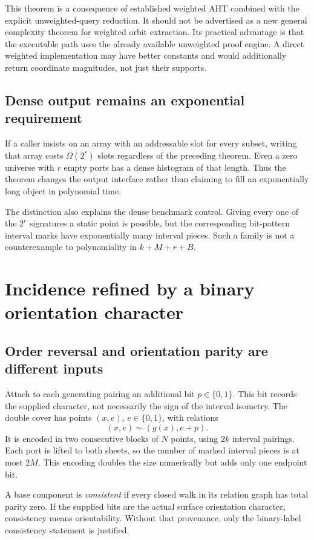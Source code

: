 \documentclass[11pt,letterpaper]{article}
\begin{document}
This theorem is a consequence of established weighted AHT combined with the
explicit unweighted-query reduction. It should not be advertised as a new
general complexity theorem for weighted orbit extraction. Its practical
advantage is that the executable path uses the already available unweighted
proof engine. A direct weighted implementation may have better constants and
would additionally return coordinate magnitudes, not just their supports.

\subsection{Dense output remains an exponential requirement}
If a caller insists on an array with an addressable slot for every subset,
writing that array costs $\Omega(2^r)$ slots regardless of the preceding theorem.
Even a zero universe with $r$ empty ports has a dense histogram of that length.
Thus the theorem changes the output interface rather than claiming to fill an
exponentially long object in polynomial time.

The distinction also explains the dense benchmark control. Giving every one
of the $2^r$ signatures a static point is possible, but the corresponding
bit-pattern interval marks have exponentially many interval pieces. Such a
family is not a counterexample to polynomiality in $k+M+r+B$.

\section{Incidence refined by a binary orientation character}
\label{sec:signed}

\subsection{Order reversal and orientation parity are different inputs}
Attach to each generating pairing an additional bit $p\in\{0,1\}$. This bit
records the supplied character, not necessarily the sign of the interval
isometry. The double cover has points $(x,e)$, $e\in\{0,1\}$, with relations
\[
 (x,e)\sim(g(x),e+p).
\]
It is encoded in two consecutive blocks of $N$ points, using $2k$ interval
pairings. Each port is lifted to both sheets, so the number of marked interval
pieces is at most $2M$. This encoding doubles the size numerically but adds
only one endpoint bit.

A base component is \emph{consistent} if every closed walk in its relation
graph has total parity zero. If the supplied bits are the actual surface
orientation character, consistency means orientability. Without that provenance,
only the binary-label consistency statement is justified.
\end{document}
